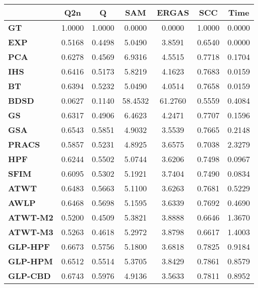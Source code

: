 \begin{tabular}{|l|c|c|c|c|c|c|}
\hline
&\textbf{Q2n}&\textbf{Q}&\textbf{SAM}&\textbf{ERGAS}&\textbf{SCC}&\textbf{Time}\\\hline
\textbf{GT}&1.0000&1.0000&0.0000&0.0000&1.0000&0.0000\\\hline
\textbf{EXP}&0.5168&0.4498&5.0490&3.8591&0.6540&0.0000\\\hline
\textbf{PCA}&0.6278&0.4569&6.9316&4.5515&0.7718&0.1704\\\hline
\textbf{IHS}&0.6416&0.5173&5.8219&4.1623&0.7683&0.0159\\\hline
\textbf{BT}&0.6394&0.5232&5.0490&4.0514&0.7658&0.0159\\\hline
\textbf{BDSD}&0.0627&0.1140&58.4532&61.2760&0.5559&0.4084\\\hline
\textbf{GS}&0.6317&0.4906&6.4623&4.2471&0.7707&0.1596\\\hline
\textbf{GSA}&0.6543&0.5851&4.9032&3.5539&0.7665&0.2148\\\hline
\textbf{PRACS}&0.5857&0.5231&4.8925&3.6575&0.7038&2.3279\\\hline
\textbf{HPF}&0.6244&0.5502&5.0744&3.6206&0.7498&0.0967\\\hline
\textbf{SFIM}&0.6095&0.5302&5.1921&3.7404&0.7490&0.0834\\\hline
\textbf{ATWT}&0.6483&0.5663&5.1100&3.6263&0.7681&0.5229\\\hline
\textbf{AWLP}&0.6468&0.5698&5.1595&3.6339&0.7692&0.4690\\\hline
\textbf{ATWT-M2}&0.5200&0.4509&5.3821&3.8888&0.6646&1.3670\\\hline
\textbf{ATWT-M3}&0.5263&0.4618&5.2972&3.8798&0.6617&1.4003\\\hline
\textbf{GLP-HPF}&0.6673&0.5756&5.1800&3.6818&0.7825&0.9184\\\hline
\textbf{GLP-HPM}&0.6512&0.5514&5.3705&3.8429&0.7861&0.8579\\\hline
\textbf{GLP-CBD}&0.6743&0.5976&4.9136&3.5633&0.7811&0.8952\\\hline
\end{tabular}
